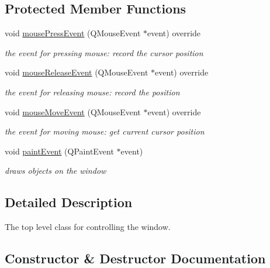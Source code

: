 \subsection*{Protected Member Functions}
\begin{DoxyCompactItemize}
\item 
void \mbox{\hyperlink{class_main_window_a1dff511c9697cbcb60150894f480b9c8}{mouse\+Press\+Event}} (Q\+Mouse\+Event $\ast$event) override
\begin{DoxyCompactList}\small\item\em the event for pressing mouse\+: record the cursor position \end{DoxyCompactList}\item 
void \mbox{\hyperlink{class_main_window_ad162aaba235ea093b59f6a9bf0fc4d01}{mouse\+Release\+Event}} (Q\+Mouse\+Event $\ast$event) override
\begin{DoxyCompactList}\small\item\em the event for releasing mouse\+: record the position \end{DoxyCompactList}\item 
void \mbox{\hyperlink{class_main_window_a9c8748d463f01ddae6abcd8f8163fcef}{mouse\+Move\+Event}} (Q\+Mouse\+Event $\ast$event) override
\begin{DoxyCompactList}\small\item\em the event for moving mouse\+: get current cursor position \end{DoxyCompactList}\item 
void \mbox{\hyperlink{class_main_window_abf05d580e91f725777cdb6a5eb0bf08c}{paint\+Event}} (Q\+Paint\+Event $\ast$event)
\begin{DoxyCompactList}\small\item\em draws objects on the window \end{DoxyCompactList}\end{DoxyCompactItemize}


\subsection{Detailed Description}
The top level class for controlling the window. 

\subsection{Constructor \& Destructor Documentation}
\mbox{\label{class_main_window_af5ee499b2fb8e1ece871f21acc9dd332}} 
